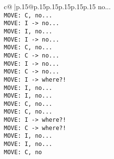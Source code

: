 \documentclass{article}
\begin{document}
{\begin{supertabular}{c@{$\;$}|p{.15\linewidth}@{}p{.15\linewidth}p{.15\linewidth}p{.15\linewidth}p{.15\linewidth}p{.15\linewidth}}
{{{ no...\\ \tt  MOVE: C, no...\\ \tt  MOVE: I -> no...\\ \tt  MOVE: I, no...\\ \tt  MOVE: I -> no...\\ \tt  MOVE: C, no...\\ \tt  MOVE: C -> no...\\ \tt  MOVE: I -> no...\\ \tt  MOVE: C -> no...\\ \tt  MOVE: I -> where?!\\ \tt  MOVE: I, no...\\ \tt  MOVE: I, no...\\ \tt  MOVE: C, no...\\ \tt  MOVE: C, no...\\ \tt  MOVE: I -> where?!\\ \tt  MOVE: C -> where?!\\ \tt  MOVE: I, no...\\ \tt  MOVE: I, no...\\ \tt  MOVE: C, no}}}
\end{supertabular}}
\end{document}

